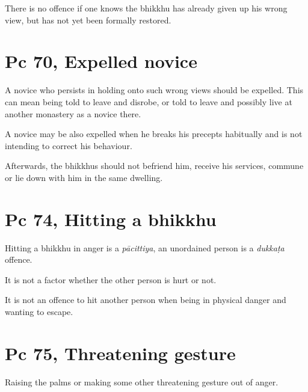 There is no offence if one knows the bhikkhu has already given up his
wrong view, but has not yet been formally restored.

\section{Pc 70, Expelled novice}

A novice who persists in holding onto such wrong views should be
expelled. This can mean being told to leave and disrobe, or told to
leave and possibly live at another monastery as a novice there.

A novice may be also expelled when he breaks his precepts habitually and
is not intending to correct his behaviour.

Afterwards, the bhikkhus should not befriend him, receive his services,
commune or lie down with him in the same dwelling.

\section{Pc 74, Hitting a bhikkhu}

Hitting a bhikkhu in anger is a \emph{pācittiya}, an unordained person
is a \emph{dukkaṭa} offence.

It is not a factor whether the other person is hurt or not.

It is not an offence to hit another person when being in physical danger
and wanting to escape.

\section{Pc 75, Threatening gesture}

Raising the palms or making some other threatening gesture out of anger.


